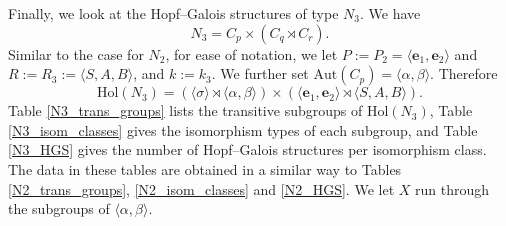 \documentclass[a4paper,reqno]{amsart}
\theoremstyle{definition}
\newcommand{\e}{\textbf{e}}
\newcommand{\Aut}{\mathrm{Aut}}
\newcommand{\Hol}{\mathrm{Hol}}
\begin{document}
\newpage
Finally, we look at the Hopf--Galois structures of type $N_3$. We have
\[N_3= C_p\times (C_q \rtimes C_r).\]
Similar to the case for $N_2$, for ease of notation, we let $P:=P_2=\langle \e_1,\e_2 \rangle$ and $R:=R_3:=\langle S,A,B \rangle$, and $k:=k_3$. We further set $\Aut(C_p)=\langle \alpha,\beta \rangle$. Therefore
\[\Hol(N_3)=(\langle \sigma \rangle \rtimes \langle \alpha,\beta \rangle) \times (\langle \e_1,\e_2 \rangle \rtimes \langle S,A,B \rangle).\]
Table \ref{N3_trans_groups} lists the transitive subgroups of $\Hol(N_3)$, Table \ref{N3_isom_classes} gives the isomorphism types of each subgroup, and Table \ref{N3_HGS} gives the number of Hopf--Galois structures per isomorphism class. The data in these tables are obtained in a similar way to Tables \ref{N2_trans_groups}, \ref{N2_isom_classes} and \ref{N2_HGS}. We let $X$ run through the subgroups of $\langle \alpha,\beta \rangle$. 
\end{document}
